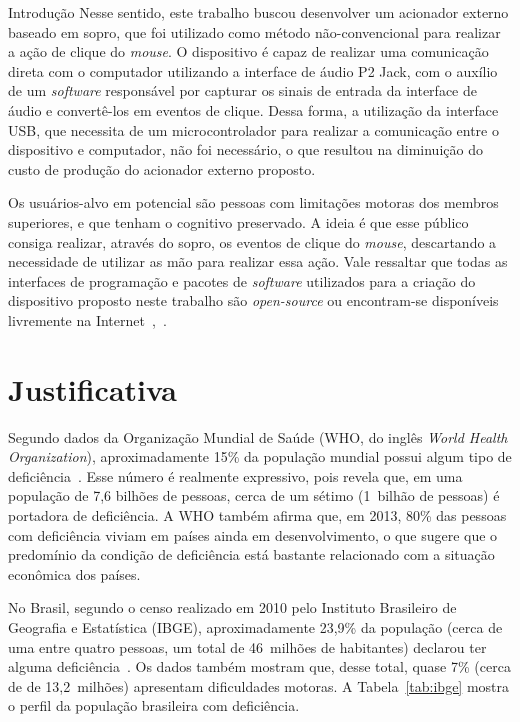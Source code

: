 \begin{chapter}{Introdução}
Nesse sentido, este trabalho buscou desenvolver um acionador externo baseado em
sopro, que foi utilizado como método não-convencional para realizar a ação de
clique do \textit{mouse}. O dispositivo é capaz de realizar uma comunicação
direta com o computador utilizando a interface de áudio P2 Jack, com o auxílio
de um \textit{software} responsável por capturar os sinais de entrada da
interface de áudio e convertê-los em eventos de clique. Dessa forma, a
utilização da interface USB, que necessita de um microcontrolador para realizar
a comunicação entre o dispositivo e computador, não foi necessário, o que
resultou na diminuição do custo de produção do acionador externo proposto. 

Os usuários-alvo em potencial são pessoas com limitações motoras dos membros
superiores, e que tenham o cognitivo preservado. A ideia é que esse público
consiga realizar, através do sopro, os eventos de clique do \textit{mouse},
descartando a necessidade de utilizar as mão para realizar essa ação. Vale
ressaltar que todas as interfaces de programação e pacotes de \textit{software}
utilizados para a criação do dispositivo proposto neste trabalho são
\textit{open-source} ou encontram-se disponíveis livremente na
Internet~\cite{portaudio},~\cite{xlib}.

\section{Justificativa}

Segundo dados da Organização Mundial de Saúde (WHO, do inglês \textit{World
Health Organization}), aproximadamente 15\% da população mundial possui algum
tipo de deficiência~\cite{WHO15}. Esse número é realmente expressivo, pois
revela que, em uma população de 7,6 bilhões de pessoas, cerca de um sétimo
(1~bilhão de pessoas) é portadora de deficiência. A WHO também afirma que,
em 2013, 80\% das pessoas com deficiência viviam em países ainda em
desenvolvimento, o que sugere que o predomínio da condição de deficiência está
bastante relacionado com a situação econômica dos países.
  
No Brasil, segundo o censo realizado em 2010 pelo Instituto Brasileiro de
Geografia e Estatística (IBGE), aproximadamente 23,9\% da população (cerca de
uma entre quatro pessoas, um total de 46~milhões de habitantes) declarou ter
alguma deficiência~\cite{tIBGE}. Os dados também mostram que, desse total, quase
7\% (cerca de de 13,2~milhões) apresentam dificuldades motoras. A
Tabela~\ref{tab:ibge} mostra o perfil da população brasileira com deficiência.


\end{chapter}
